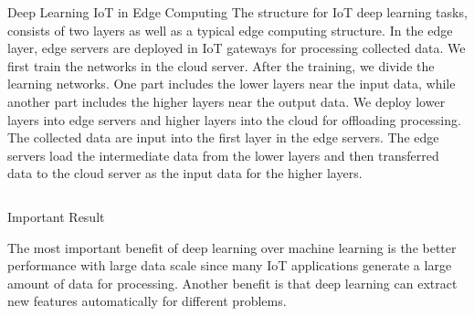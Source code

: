 \documentclass[final]{beamer}
\newlength{\onecolwid}
\newlength{\twocolwid}
\begin{document}
\begin{frame}
\begin{columns}[t]
\begin{column}{\twocolwid}
\begin{columns}[t,totalwidth=\twocolwid]
\begin{column}{\onecolwid}
\begin{exampleblock}{Deep Learning IoT in Edge Computing}
The structure for IoT deep learning tasks, consists of two layers as well as a typical edge computing structure. In the edge layer, edge servers are deployed in IoT gateways for processing collected data. We first train the networks in the cloud server. After the training, we divide the learning networks. One part includes the lower layers near the input data, while another part includes the higher layers near the output data. We deploy lower layers into edge servers and higher layers into the cloud for offloading processing. The collected data are input into the first layer in the edge servers. The edge servers load the intermediate data from the lower layers and then transferred data to the cloud server as the input data for the higher layers.

\end{exampleblock}


\end{column} %

\end{columns} %


\begin{alertblock}{Important Result}

The most important benefit of deep learning over machine learning is the better performance with large data scale since many IoT applications generate a large amount of data for processing. Another benefit is that deep learning can extract new features automatically for different problems.

\end{alertblock} 


\begin{columns}[t,totalwidth=\twocolwid] %

\begin{column}{\onecolwid} %



\end{column}
\end{columns}
\end{column}
\end{columns}
\end{frame}
\end{document}
